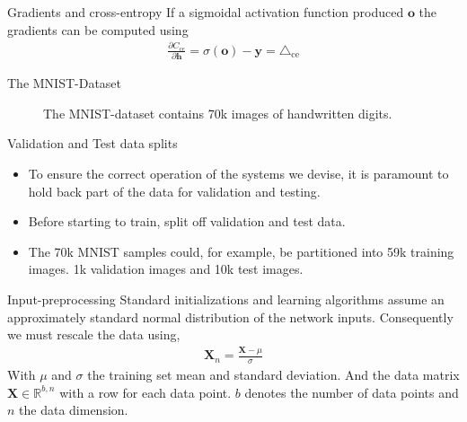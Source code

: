 \documentclass[notes]{beamer}
\begin{document}
    \begin{frame}{Gradients and cross-entropy}
      If a sigmoidal activation function produced $\mathbf{o}$ the gradients can be computed using ~\cite{nielsen2015neural,bishop2006pattern}
      \begin{align} 
         \frac{\partial C_{ce}}{\partial \mathbf{h}} 
         = \sigma(\mathbf{o}) - \mathbf{y} = \triangle_{\text{ce}}
      \end{align}
    \end{frame}

    \begin{frame}{The MNIST-Dataset}
      \begin{figure}
        
        \caption{The MNIST-dataset contains 70k images of handwritten digits.}
      \end{figure}
    \end{frame}

    \begin{frame}{Validation and Test data splits}
      \begin{itemize}
        \item To ensure the correct operation of the systems we devise, it is paramount to 
        hold back part of the data for validation and testing.
        \item Before starting to train, split off validation and test data.
        \item The 70k MNIST samples could, for example, be partitioned into 59k training images.
        1k validation images and 10k test images. 
      \end{itemize}
    \end{frame}

    \begin{frame}{Input-preprocessing}
      Standard initializations and learning algorithms assume an approximately standard normal distribution
      of the network inputs. Consequently we must rescale the data using,
      \begin{align}
        \mathbf{X}_n = \frac{\mathbf{X} - \mu}{\sigma}
      \end{align}
      With $\mu$ and $\sigma$ the training set mean and standard deviation. And the data matrix $\mathbf{X} \in \mathbb{R}^{b,n}$ with a row for each data point.
      $b$ denotes the number of data points and $n$ the data dimension.
    \end{frame}
\end{document}
